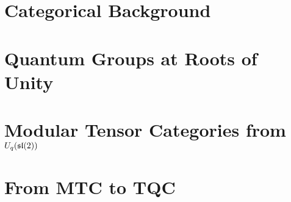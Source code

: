 \mediumspacing

\chapter{Categorical Background} 
\label{chap:categoricalbackground} 
\doublespacing


\mediumspacing

\chapter{Quantum Groups at Roots of Unity} 
\label{chap:uqsl2} 
\doublespacing


\mediumspacing


\chapter{Modular Tensor Categories from $U_q(\mathfrak{sl}(2))$} 
\label{chap:MTCfromuqsl2} 
\doublespacing


\mediumspacing

\chapter{From MTC to TQC} 
\label{chap:MTCtoTQC} 
\doublespacing


\mediumspacing


\clearpage
{}
\nocite{*}




%




